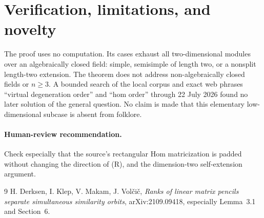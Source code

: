 \documentclass[11pt]{article}
\begin{document}
\section{Verification, limitations, and novelty}
The proof uses no computation.  Its cases exhaust all two-dimensional modules
over an algebraically closed field: simple, semisimple of length two, or a
nonsplit length-two extension.  The theorem does not address non-algebraically
closed fields or $n\geq3$.  A bounded search of the local corpus and exact
web phrases ``virtual degeneration order'' and ``hom order'' through
22 July 2026 found no later solution of the general question.  No claim is
made that this elementary low-dimensional subcase is absent from folklore.

\paragraph{Human-review recommendation.} Check especially that the source's
rectangular Hom matricization is padded without changing the direction of
(R), and the dimension-two self-extension argument.

\begin{thebibliography}{9}
 H. Derksen, I. Klep, V. Makam, J. Vol\v{c}i\v{c},
\emph{Ranks of linear matrix pencils separate simultaneous similarity
orbits}, arXiv:2109.09418, especially Lemma~3.1 and Section~6.
\end{thebibliography}
\end{document}
